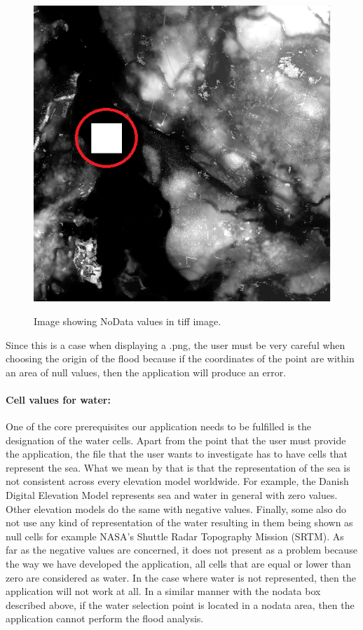 \begin{figure}[h!]
\centering
{\includegraphics[width=0.8\linewidth]{gfx/Analysis_Specs/nodata.png}}
\caption{Image showing NoData values in tiff image.}
\label{fig:analysis_nodata}
\end{figure}

Since this is a case when displaying a .png, the user must be very careful when choosing the origin of the flood because if the coordinates of the point are within an area of null values, then the application will produce an error.

\paragraph{Cell values for water:} One of the core prerequisites our application needs to be fulfilled is the designation of the water cells. Apart from the point that the user must provide the application, the file that the user wants to investigate has to have cells that represent the sea. What we mean by that is that the representation of the sea is not consistent across every elevation model worldwide. For example, the Danish Digital Elevation Model represents sea and water in general with zero values. Other elevation models do the same with negative values. Finally, some also do not use any kind of representation of the water resulting in them being shown as null cells for example NASA's Shuttle Radar Topography Mission (SRTM). As far as the negative values are concerned, it does not present as a problem because the way we have developed the application, all cells that are equal or lower than zero are considered as water. In the case where water is not represented, then the application will not work at all. In a similar manner with the nodata box described above, if the water selection point is located in a nodata area, then the application cannot perform the flood analysis.